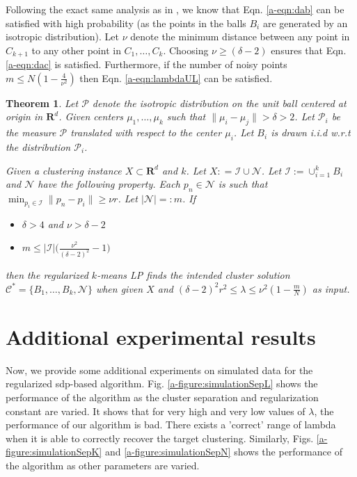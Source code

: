 \documentclass[12pt]{article}
\newcommand{\mc}{\mathcal}
\newcommand{\mb}{\mathbf}
\newtheorem{theorem}{Theorem}
\begin{document}
Following the exact same analysis as in \cite{awasthi2015relax}, we know that Eqn. \ref{a-eqn:dab} can be satisfied with high probability (as the points in the balls $B_i$ are generated by an isotropic distribution).   Let $\nu$ denote the minimum distance between any point in $C_{k+1}$ to any other point in $C_1, \ldots, C_k$. Choosing $\nu \ge (\delta-2)$ ensures that Eqn. \ref{a-eqn:dac} is satisfied. Furthermore, if the number of noisy points $m \le N (1-\frac{4}{\nu^2})$ then Eqn. \ref{a-eqn:lambdaUL} can be satisfied.

\begin{theorem}
\label{a-theorem:lptight}
Let $\mc P$ denote the isotropic distribution on the unit ball centered at origin in $\mb R^d$. Given centers $\mu_1, \ldots, \mu_k$ such that $\|\mu_i - \mu_j\| > \delta > 2$. Let $\mc P_i$ be the measure $\mc P$ translated with respect to the center $\mu_i$. Let $B_i$ is drawn i.i.d w.r.t the distribution $\mc P_i$. 

Given a clustering instance $X \subset \mb R^d$ and $k$. Let $X : = \mc I \cup \mc N$. Let $\mc I := \cup_{i=1}^k B_i$ and $\mc N$ have the following property. Each $p_n \in \mc N$ is such that $\min_{p_i \in \mc I} \|p_n - p_i\| \ge \nu r$. Let $|\mc N| =: m$. If

\begin{itemize}
  \item $\delta > 4$ and $\nu > \delta - 2$ 
  \item $m \le |\mc I|\Big(\frac{\nu^2}{(\delta-2)^2}-1\Big)$
\end{itemize}
then the regularized $k$-means LP finds the intended cluster solution  $\mc C^* = \{B_1, \ldots, B_k, \mc N\}$ when given $X$ and $(\delta - 2)^2r^2 \le \lambda \le \nu^2(1-\frac{m}{N})$ as input.
\end{theorem}

\section{Additional experimental results}
Now, we provide some additional experiments on simulated data for the regularized sdp-based algorithm. Fig. \ref{a-figure:simulationSepL} shows the performance of the algorithm as the cluster separation and regularization constant are varied. It shows that for very high and very low values of $\lambda$, the performance of our algorithm is bad. There exists a 'correct' range of lambda when it is able to correctly recover the target clustering. Similarly, Figs. \ref{a-figure:simulationSepK} and \ref{a-figure:simulationSepN} shows the performance of the algorithm as other parameters are varied.
\end{document}
